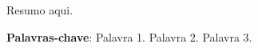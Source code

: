 \clearpage\mbox{}\clearpage

\begin{resumo}
    Resumo aqui.
    
    \vspace{\onelineskip}
    \noindent
    \textbf{Palavras-chave}: Palavra 1. Palavra 2. Palavra 3. %
\end{resumo}

        


